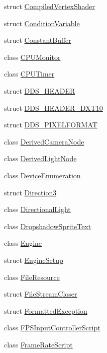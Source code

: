 \begin{DoxyCompactItemize}
\item 
struct \hyperlink{structmage_1_1_compiled_vertex_shader}{Compiled\+Vertex\+Shader}
\item 
struct \hyperlink{structmage_1_1_condition_variable}{Condition\+Variable}
\item 
struct \hyperlink{structmage_1_1_constant_buffer}{Constant\+Buffer}
\item 
class \hyperlink{classmage_1_1_c_p_u_monitor}{C\+P\+U\+Monitor}
\item 
class \hyperlink{classmage_1_1_c_p_u_timer}{C\+P\+U\+Timer}
\item 
struct \hyperlink{structmage_1_1_d_d_s___h_e_a_d_e_r}{D\+D\+S\+\_\+\+H\+E\+A\+D\+ER}
\item 
struct \hyperlink{structmage_1_1_d_d_s___h_e_a_d_e_r___d_x_t10}{D\+D\+S\+\_\+\+H\+E\+A\+D\+E\+R\+\_\+\+D\+X\+T10}
\item 
struct \hyperlink{structmage_1_1_d_d_s___p_i_x_e_l_f_o_r_m_a_t}{D\+D\+S\+\_\+\+P\+I\+X\+E\+L\+F\+O\+R\+M\+AT}
\item 
class \hyperlink{classmage_1_1_derived_camera_node}{Derived\+Camera\+Node}
\item 
class \hyperlink{classmage_1_1_derived_light_node}{Derived\+Light\+Node}
\item 
class \hyperlink{classmage_1_1_device_enumeration}{Device\+Enumeration}
\item 
struct \hyperlink{structmage_1_1_direction3}{Direction3}
\item 
class \hyperlink{classmage_1_1_directional_light}{Directional\+Light}
\item 
class \hyperlink{classmage_1_1_dropshadow_sprite_text}{Dropshadow\+Sprite\+Text}
\item 
class \hyperlink{classmage_1_1_engine}{Engine}
\item 
struct \hyperlink{structmage_1_1_engine_setup}{Engine\+Setup}
\item 
class \hyperlink{classmage_1_1_file_resource}{File\+Resource}
\item 
struct \hyperlink{structmage_1_1_file_stream_closer}{File\+Stream\+Closer}
\item 
struct \hyperlink{structmage_1_1_formatted_exception}{Formatted\+Exception}
\item 
class \hyperlink{classmage_1_1_f_p_s_input_controller_script}{F\+P\+S\+Input\+Controller\+Script}
\item 
class \hyperlink{classmage_1_1_frame_rate_script}{Frame\+Rate\+Script}
\item 

\end{DoxyCompactItemize}
